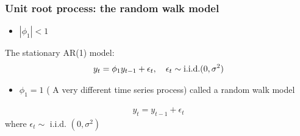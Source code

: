 \documentclass[a4paper,twoside,11pt]{article}
\begin{document}
\subsubsection{Unit root process: the random walk model}
\begin{itemize}
    \item $|\phi_1| <1$ 
\end{itemize}
The stationary AR(1) model:
\begin{equation*}
\begin{aligned}
y_t = \phi_1 y_{t-1} + \epsilon_t, \ \ \ \epsilon_t \sim \textmd{i.i.d.} (0,\sigma^2) 
\end{aligned}
\end{equation*}
\begin{itemize}
    \item $\phi_1 =1$ ( A very different time series process) called a random walk model
\end{itemize}
\begin{equation*}
\begin{aligned}
y_t = y_{t-1} + \epsilon_t 
\end{aligned}
\end{equation*}
where $\epsilon_t \sim$ i.i.d. $(0,\sigma^2)$ 
\end{document}

